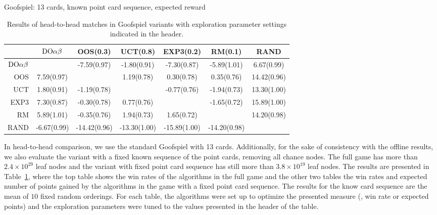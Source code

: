 \begin{table}
\begin{scriptsize}
Goofspiel: 13 cards, known point card sequence, expected reward
\begin{tabular}{|r|cccccc|}\hline
&$\textrm{DO}\alpha\beta$&OOS(0.3)&UCT(0.8)&EXP3(0.2)&RM(0.1)&RAND\\\hline
$\textrm{DO}\alpha\beta$&&-7.59(0.97)&-1.80(0.91)&-7.30(0.87)&-5.89(1.01)&6.67(0.99)\\
OOS&7.59(0.97)&&1.19(0.78)&0.30(0.78)&0.35(0.76)&14.42(0.96)\\
UCT&1.80(0.91)&-1.19(0.78)&&-0.77(0.76)&-1.94(0.73)&13.30(1.00)\\
EXP3&7.30(0.87)&-0.30(0.78)&0.77(0.76)&&-1.65(0.72)&15.89(1.00)\\
RM&5.89(1.01)&-0.35(0.76)&1.94(0.73)&1.65(0.72)&&14.20(0.98)\\
RAND&-6.67(0.99)&-14.42(0.96)&-13.30(1.00)&-15.89(1.00)&-14.20(0.98)&\\
\hline
\end{tabular}
\end{scriptsize}
\caption{Results of head-to-head matches in Goofspiel variants with exploration parameter settings indicated in the header.}\label{fig:matches:goof}
\end{table}

In head-to-head comparison, we use the standard Goofspiel with 13 cards. Additionally, for the sake of consistency with the offline results, we also evaluate the variant with a fixed known sequence of the point cards, removing all chance nodes. The full game has more than $2.4\times 10^{29}$ leaf nodes and the variant with fixed point card sequence has still more than $3.8\times 10^{19}$ leaf nodes. The results are presented in Table~\ref{fig:matches:goof}, where the top table shows the win rates of the algorithms in the full game and the other two tables the win rates and expected number of points gained by the algorithms in the game with a fixed point card sequence. The results for the know card sequence are the mean of $10$ fixed random orderings. For each table, the algorithms were set up to optimize the presented measure (\ie, win rate or expected points) and the exploration parameters were tuned to the values presented in the header of the table.

